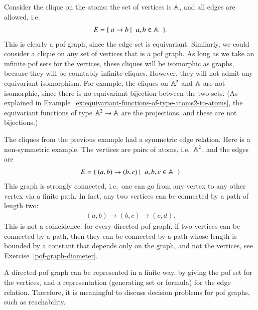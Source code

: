 \begin{myexample}[Cliques]
    Consider the clique on the  atoms: the set of vertices  is $\mathbb A$, and all edges are allowed, i.e. 
    \begin{align*}
    E = \setbuild{ a \to b}{$a,b \in \atoms$}.
    \end{align*}
    This is clearly a pof graph, since the edge set is equivariant. Similarly, we could consider a clique on any set of vertices that is a pof graph. As long as we take an infinite pof sets for the vertices, these cliques will be isomorphic as graphs, because they will be countably infinite cliques. However, they will not admit any equivariant isomorphism. For example, the cliques on $\mathbb A^2$ and $\mathbb A$ are not isomorphic, since there is no equivariant bijection between the two sets. (As explained in Example~\ref{ex:equivariant-functions-of-type-atoms2-to-atoms}, the equivariant functions of type $\mathbb A^2 \to \mathbb A$ are the projections, and these are not bijections.)
\end{myexample}
\begin{myexample} The cliques from the previous example had a symmetric edge relation. Here is a non-symmetric example. The vertices are pairs of atoms, i.e.~$\mathbb A^2$, and the edges are 
    \begin{align*}
    E = \setbuild{ (a,b) \to (b,c)}{$a,b,c \in \atoms$}
    \end{align*}
    This graph is strongly connected, i.e.~one can go from any vertex to any other vertex via a finite path. In fact, any two vertices can be connected by a  path of length two: 
    \begin{align*}
    (a,b) \to (b,c) \to (c,d).
    \end{align*}
    This is not a coincidence: for every directed pof graph, if two vertices can be connected by a path, then they can be connected by a path whose length is bounded by a constant that depends only  on the graph, and not the vertices, see Exercise~\ref{pof-graph-diameter}.
\end{myexample}

A directed pof graph can be represented in a finite way, by giving the pof set for the vertices, and a representation (generating set or formula) for the edge relation. Therefore, it is meaningful to discuss decision problems for pof graphs, such as reachability. 



